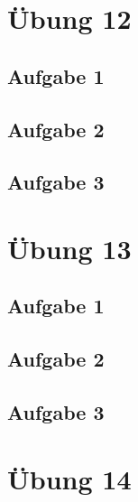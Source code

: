\documentclass[a4paper]{article}
\begin{document}
\newpage
\section{Übung 12}
\subsection{Aufgabe 1}
\textit{}

\subsection{Aufgabe 2}
\textit{}


\subsection{Aufgabe 3}
\textit{}




\newpage
\section{Übung 13}
\subsection{Aufgabe 1}
\textit{}

\subsection{Aufgabe 2}
\textit{}


\subsection{Aufgabe 3}
\textit{}




\newpage
\section{Übung 14}
\end{document}
